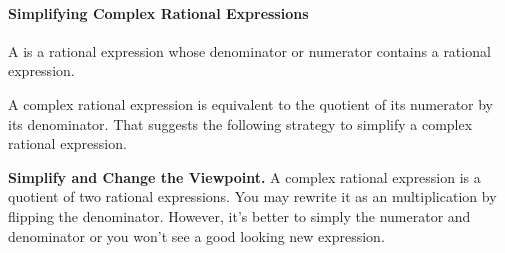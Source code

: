 
\paragraph*{Simplifying Complex Rational Expressions}
	A  is a rational expression whose denominator or numerator contains a rational expression.

	A complex rational expression is equivalent to the quotient of its numerator by its denominator. That suggests the following strategy to simplify a complex rational expression.

	\begin{trick}
		\textbf{Simplify and Change the Viewpoint.} A complex rational expression is a quotient of two rational expressions. You may rewrite it as an multiplication by flipping the denominator. However, it's better to simply the numerator and denominator or you won't see a good looking new expression.
	\end{trick}


